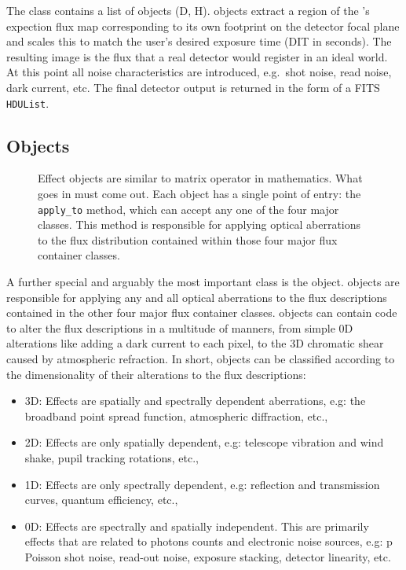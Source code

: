 The \DetectorArray{} class contains a list of \Detector{} objects (D, H).
\Detector{} objects extract a region of the \ImagePlane{}'s expection flux map corresponding to its own footprint on the detector focal plane and scales this to match the user's desired exposure time (DIT in seconds).
The resulting image is the flux that a real detector would register in an ideal world.
At this point all noise characteristics are introduced, e.g.~shot noise, read noise, dark current, etc.
The final detector output is returned in the form of a FITS \lstinline{HDUList}.


\subsection{\Effect{} Objects}

\begin{figure}
\label{fig-effect}
\caption{Effect objects are similar to matrix operator in mathematics.
What goes in must come out.
Each \Effect{} object has a single point of entry: the \lstinline{apply_to} method, which can accept any one of the four major \ScopeSim{} classes.
This method is responsible for applying optical aberrations to the flux distribution contained within those four major flux container classes.}
\end{figure}

A further special and arguably the most important \ScopeSim{} class is the \Effect{} object.
\Effect{} objects are responsible for applying any and all optical aberrations to the flux descriptions contained in the other four major flux container classes.
\Effect{} objects can contain code to alter the flux descriptions in a multitude of manners, from simple 0D alterations like adding a dark current to each pixel, to the 3D chromatic shear caused by atmospheric refraction.
In short, \Effect{} objects can be classified according to the dimensionality of their alterations to the flux descriptions:

\begin{itemize}
\item 3D: Effects are spatially and spectrally dependent aberrations, e.g: the broadband point spread function, atmospheric diffraction, etc.,

\item 2D: Effects are only spatially dependent, e.g: telescope vibration and wind shake, pupil tracking rotations, etc.,

\item 1D: Effects are only spectrally dependent, e.g: reflection and transmission curves, quantum efficiency, etc.,

\item 0D: Effects are spectrally and spatially independent. This are primarily effects that are related to photons counts and electronic noise sources, e.g: p
Poisson shot noise, read-out noise, exposure stacking, detector linearity, etc.
\end{itemize}

